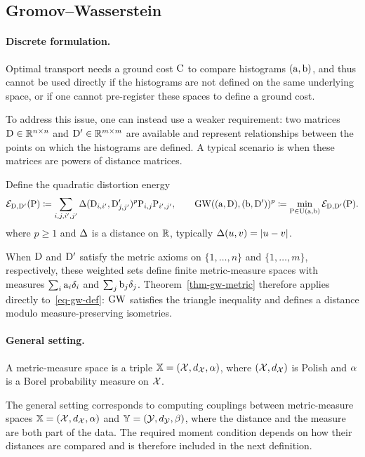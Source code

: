 \subsection{Gromov--Wasserstein}
\label{sec-gromov-wasserstein}
\paragraph{Discrete formulation.}
Optimal transport needs a ground cost $\mathrm{C}$ to compare histograms $(\mathrm{a},\mathrm{b})$, and thus cannot be used directly if the histograms are not defined on the same underlying space, or if one cannot pre-register these spaces to define a ground cost.

To address this issue, one can instead use a weaker requirement: two matrices $\mathrm{D} \in \mathbb{R}^{n \times n}$ and $\mathrm{D}' \in \mathbb{R}^{m \times m}$ are available and represent relationships between the points on which the histograms are defined. A typical scenario is when these matrices are powers of distance matrices.

Define the quadratic distortion energy
\begin{equation}\label{eq-gw-def}
\mathcal{E}_{\mathrm{D},\mathrm{D}'}(\mathrm{P})
\coloneqq
\sum_{i,j,i',j'} \Delta(\mathrm{D}_{i,i'},\mathrm{D}'_{j,j'})^p \mathrm{P}_{i,j}\mathrm{P}_{i',j'},
\qquad
\operatorname{\mathrm{GW}}( (\mathrm{a},\mathrm{D}), (\mathrm{b},\mathrm{D}') )^p
\coloneqq
\min_{\mathrm{P} \in \mathrm{U}(\mathrm{a},\mathrm{b}) }
\mathcal{E}_{\mathrm{D},\mathrm{D}'}(\mathrm{P}).
\end{equation}
where $p \geq 1$ and $\Delta$ is a distance on $\mathbb{R}$, typically $\Delta(u,v)=|u-v|$.

When $\mathrm{D}$ and $\mathrm{D}'$ satisfy the metric axioms on $\{1,\ldots,n\}$ and $\{1,\ldots,m\}$, respectively, these weighted sets define finite metric-measure spaces with measures $\sum_i\mathrm{a}_i\delta_i$ and $\sum_j\mathrm{b}_j\delta_j$. Theorem~\ref{thm-gw-metric} therefore applies directly to~\eqref{eq-gw-def}: $\operatorname{\mathrm{GW}}$ satisfies the triangle inequality and defines a distance modulo measure-preserving isometries.

\paragraph{General setting.}
\begin{defn}\label{def-metric-measure-space}
A metric-measure space is a triple
$\mathbb{X}=(\mathcal{X},d_{\mathcal{X}},\alpha)$,
where $(\mathcal{X},d_{\mathcal{X}})$ is Polish and $\alpha$ is a Borel probability measure on $\mathcal{X}$.
\end{defn}
The general setting corresponds to computing couplings between metric-measure spaces $\mathbb{X}=(\mathcal{X},d_{\mathcal{X}},\alpha)$ and $\mathbb{Y}=(\mathcal{Y},d_{\mathcal{Y}},\beta)$, where the distance and the measure are both part of the data. The required moment condition depends on how their distances are compared and is therefore included in the next definition.

